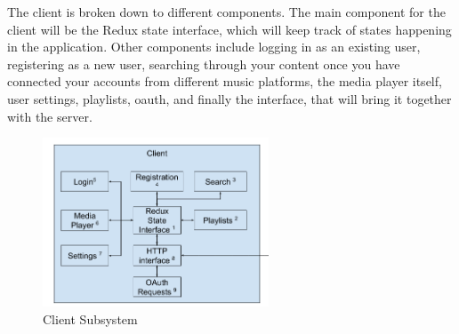 The client is broken down to different components. The main component for the client will be the Redux state interface, which will keep track of states happening in the application. Other components include logging in as an existing user, registering as a new user, searching through your content once you have connected your accounts from different music platforms, the media player itself, user settings, playlists, oauth, and finally the interface, that will bring it together with the server.

\begin{figure}[h!]
	\centering
 	\includegraphics[width=0.60\textwidth]{images/client/ADS-SDS-Client.png}
 	\caption{Client Subsystem}
\end{figure}

\newpage
